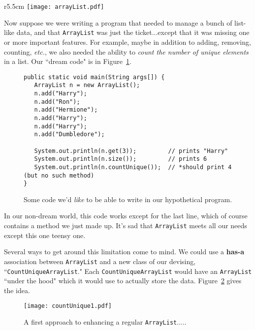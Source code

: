 \begin{wrapfigure}{r}{5.5cm}
\vspace{-.2in}
\texttt{[image: arrayList.pdf]}
\caption{An abbreviated \texttt{ArrayList} class.}
\label{fig:abbrArrayList}
\end{wrapfigure}

Now suppose we were writing a program that needed to manage a bunch of
list-like data, and that \texttt{ArrayList} was just the ticket...except that
it was missing one or more important features. For example, maybe in addition
to adding, removing, counting, \textit{etc.}, we also needed the ability to
\textit{count the number of unique elements} in a list. Our ``dream code" is
in Figure~\ref{fig:dreamCountUnique}.

\begin{figure}[hb]
\centering
\begin{Verbatim}[fontsize=\footnotesize,samepage=true,frame=single]
public static void main(String args[]) {
   ArrayList n = new ArrayList();
   n.add("Harry");
   n.add("Ron");
   n.add("Hermione");
   n.add("Harry");
   n.add("Harry");
   n.add("Dumbledore");
 
   System.out.println(n.get(3));         // prints "Harry"
   System.out.println(n.size());         // prints 6
   System.out.println(n.countUnique());  // *should print 4 (but no such method)
}
\end{Verbatim}
\caption{Some code we'd \textit{like} to be able to write in our hypothetical
program.}
\label{fig:dreamCountUnique}
\end{figure}

In our non-dream world, this code works except for the last line, which of
course contains a method we just made up. It's sad that \texttt{ArrayList}
meets all our needs except this one teensy one.

Several ways to get around this limitation come to mind. We could use a
\textbf{has-a} association between \texttt{ArrayList} and a new class of our
devising, ``\texttt{CountUniqueArrayList}." Each \texttt{CountUniqueArrayList}
would have an \texttt{ArrayList} ``under the hood" which it would use to
actually store the data. Figure~\ref{fig:countUnique1} gives the idea.

\begin{figure}
\centering
\texttt{[image: countUnique1.pdf]}  %
\caption{A first approach to enhancing a regular \texttt{ArrayList}.....}
\label{fig:countUnique1}
\end{figure}

